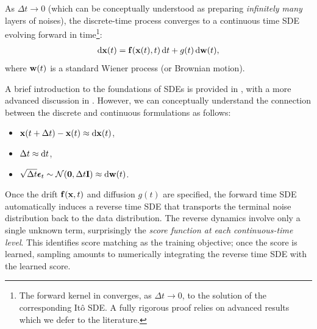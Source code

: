 As $\Delta t \to 0$ (which can be conceptually understood as preparing \emph{infinitely many} layers of noises), the discrete-time process converges to a continuous time SDE evolving forward in time\footnote{The forward kernel in  converges, as $\Delta t\to0$, to the solution of the corresponding Itô SDE. A fully rigorous proof relies on advanced results which we defer to the literature.}:
\begin{align*}
    \mathop{}\!\mathrm{d} {\mathbf{x}}(t) = {\mathbf{f}}({\mathbf{x}}(t), t) \mathop{}\!\mathrm{d} t + g(t) \mathop{}\!\mathrm{d} {\mathbf{w}}(t),
\end{align*}
where ${\mathbf{w}}(t)$ is a standard Wiener process (or Brownian motion).

A brief introduction to the foundations of SDEs is provided in , with a more advanced discussion in . However, we can conceptually understand the connection between the discrete and continuous formulations as follows:
\begin{itemize}
    \item ${\mathbf{x}}(t+\Delta t) - {\mathbf{x}}(t) \approx \mathop{}\!\mathrm{d} {\mathbf{x}}(t)$,
    \item $\Delta t \approx \mathop{}\!\mathrm{d} t$,
    \item $\sqrt{\Delta t} \bm{\epsilon}_t \sim \mathcal{N}(\bm{0}, \Delta t {\mathbf{I}}) \approx \mathop{}\!\mathrm{d} {\mathbf{w}}(t)$.
\end{itemize}
Once the drift ${\mathbf{f}}({\mathbf{x}},t)$ and diffusion $g(t)$ are specified, the forward time SDE automatically induces a reverse time SDE that transports the terminal noise distribution back to the data distribution. The reverse dynamics involve only a single unknown term, surprisingly the \emph{score function at each continuous-time level}. This identifies score matching as the training objective; once the score is learned, sampling amounts to numerically integrating the reverse time SDE with the learned score.


